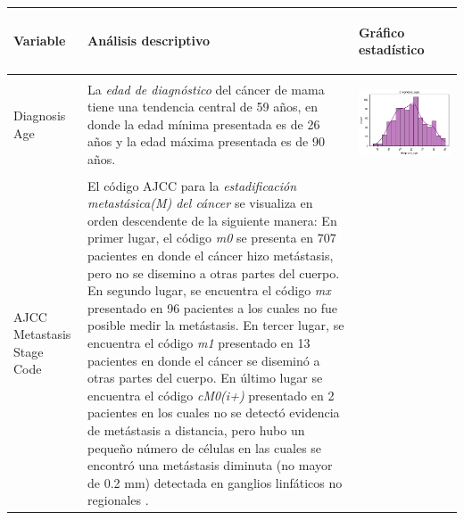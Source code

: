 \begin{table}[htb!]
	\footnotesize
	\begin{threeparttable}
		\begin{tabular}{p{2.5cm} p{7cm} p{6.5cm}} \toprule
			\begin{center}Variable\end{center}   	 
			&\begin{center}Análisis descriptivo\end{center}             
			&\begin{center}Gráfico estadístico\end{center}\\ \hline
			Diagnosis Age
			& La \textit{edad de diagnóstico} del cáncer de mama tiene una tendencia central de 59 años, en donde la edad mínima presentada es de 26 años y la edad máxima presentada es de 90 años.
			& \begin{center}\includegraphics[width=1\linewidth]{NOTEBOOK/IMAGENES_DESCRIPTIVAS/1_diagnosis_age}\end{center}
			\\ \hline
			AJCC Metastasis Stage Code 
			& El código AJCC para la \textit{estadificación metastásica(M) del cáncer} se visualiza en orden descendente de la siguiente manera: En primer lugar, el código \textit{m0} se presenta en 707 pacientes en donde el cáncer hizo metástasis, pero no se disemino a otras partes del cuerpo. En segundo lugar, se encuentra el código \textit{mx} presentado en 96 pacientes a los cuales no fue posible medir la metástasis. En tercer lugar, se encuentra el código \textit{m1} presentado en 13 pacientes en donde el cáncer se diseminó a otras partes del cuerpo. En último lugar se encuentra el código \textit{cM0(i+)} presentado en 2 pacientes en los cuales no se detectó evidencia de metástasis a distancia, pero hubo un pequeño número de células en las cuales se encontró una metástasis diminuta (no mayor de 0.2 mm) detectada en ganglios linfáticos no regionales \cite{NCI}.

\end{tabular}
\end{threeparttable}
\end{table}
